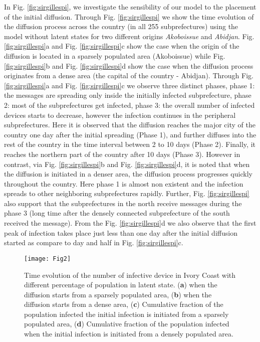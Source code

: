 \documentclass[review]{elsarticle}
\begin{document}
In Fig. \ref{fig:sirgillespi}, we investigate the sensibility of our model to the placement of the initial diffusion. Through Fig. \ref{fig:sirgillespi} we show the time evolution of the diffusion process across the country (in all 255 subprefectures) using the model without latent states for two different origins \emph{Akoboissue} and \emph{Abidjan}. Fig. \ref{fig:sirgillespi}a and Fig. \ref{fig:sirgillespi}c show the case when the origin of the diffusion is located in a sparsely populated area (Akoboissue) while Fig. \ref{fig:sirgillespi}b and Fig. \ref{fig:sirgillespi}d show the case when the diffusion process originates from a dense area (the capital of the country - Abidjan). Through Fig. \ref{fig:sirgillespi}a and Fig. \ref{fig:sirgillespi}c we observe three distinct phases, phase 1: the messages are spreading only inside the initially infected subprefecture, phase 2: most of the subprefectures get infected, phase 3: the overall number of infected devices starts to decrease, however the infection continues in the peripheral subprefectures. Here it is observed that the diffusion reaches the major city of the country one day after the initial spreading (Phase 1), and further diffuses into the rest of the country in the time interval between 2 to 10 days (Phase 2). Finally, it reaches the northern part of the country after 10 days (Phase 3). However in contrast, via Fig. \ref{fig:sirgillespi}b and Fig. \ref{fig:sirgillespi}d, it is noted that when the diffusion is initiated in a denser area, the diffusion process progresses quickly throughout the country. Here phase 1 is almost non existent and the infection spreads to other neighboring subprefectures rapidly. Further, Fig. \ref{fig:sirgillespi} also support that the subprefectures in the north receive messages during the phase 3 (long time after the densely connected subprefecture of the south received the message). From the Fig. \ref{fig:sirgillespi}d we also observe that the first peak of infection takes place just less than one day after the initial diffusion started as compare to day and half in Fig. \ref{fig:sirgillespi}c.
\begin{figure}
    \centering
    \texttt{[image: Fig2]}
    \caption{Time evolution of the number of infective device in Ivory Coast with different percentage of population in latent state. (\textbf{a}) when the diffusion starts from a sparsely populated area, (\textbf{b})  when the diffusion starts from a dense area, (\textbf{c}) Cumulative fraction of the population infected the initial infection is initiated from a sparsely populated area, (\textbf{d}) Cumulative fraction of the population infected when the initial infection is initiated from a densely populated area.}
    \label{fig:sirvssirlatent}
\end{figure}
\end{document}
